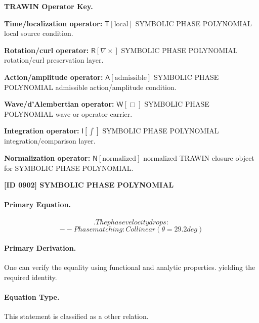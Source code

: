 \par\vspace{0.45\baselineskip}
\noindent\begin{minipage}[t]{\linewidth}
\begingroup
\small
\raggedright
\textbf{TRAWIN Operator Key.}\par
\noindent\textbf{Time/localization operator:} $\mathsf{T}\!\left[\mathrm{local}\right]$ SYMBOLIC PHASE POLYNOMIAL local source condition.\par
\noindent\textbf{Rotation/curl operator:} $\mathsf{R}\!\left[\nabla\times\right]$ SYMBOLIC PHASE POLYNOMIAL rotation/curl preservation layer.\par
\noindent\textbf{Action/amplitude operator:} $\mathsf{A}\!\left[\mathrm{admissible}\right]$ SYMBOLIC PHASE POLYNOMIAL admissible action/amplitude condition.\par
\noindent\textbf{Wave/d'Alembertian operator:} $\mathsf{W}\!\left[\Box\right]$ SYMBOLIC PHASE POLYNOMIAL wave or operator carrier.\par
\noindent\textbf{Integration operator:} $\mathsf{I}\!\left[\int\right]$ SYMBOLIC PHASE POLYNOMIAL integration/comparison layer.\par
\noindent\textbf{Normalization operator:} $\mathsf{N}\!\left[\mathrm{normalized}\right]$ normalized TRAWIN closure object for SYMBOLIC PHASE POLYNOMIAL.\par
\endgroup
\end{minipage}

\clearpage
\noindent\textbf{[ID 0902] SYMBOLIC PHASE POLYNOMIAL}\par
\vspace{0.35em}
\paragraph{Primary Equation.}
\[
. The phase velocity drops:
\]
\[
-- Phase matching: Collinear (\theta = 29.2 deg )
\]

\paragraph{Primary Derivation.}
One can verify the equality using functional and analytic properties. yielding the required identity.
\paragraph{Equation Type.}
This statement is classified as a other relation.

